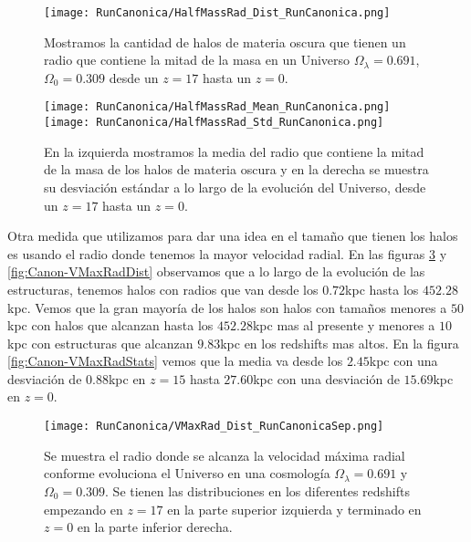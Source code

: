\begin{figure}[H]
    \centering
    \texttt{[image: RunCanonica/HalfMassRad\_Dist\_RunCanonica.png]}
    \caption[Distribución del radio que contiene la mitad de la masa en un Universo $\Omega_\lambda = 0.691 $, $\Omega_0 = 0.309$]{\footnotesize Mostramos la cantidad de halos de materia oscura que tienen un radio que contiene la mitad de la masa en un Universo $\Omega_\lambda = 0.691 $, $\Omega_0 = 0.309$ desde un $z=17$ hasta un $z=0$.}
    \label{fig:Canon-HalfMassRadDist}
\end{figure}

\begin{figure}[H]
    \centering
    \texttt{[image: RunCanonica/HalfMassRad\_Mean\_RunCanonica.png]}
    \texttt{[image: RunCanonica/HalfMassRad\_Std\_RunCanonica.png]}
    \caption[Media y desviación estándar del radio de la mitad de la masa de un Universo $\Omega_\lambda = 0.691 $, $\Omega_0 = 0.309$]{\footnotesize En la izquierda mostramos la media del radio que contiene la mitad de la masa de los halos de materia oscura y en la derecha se muestra su desviación estándar a lo largo de la evolución del Universo, desde un $z=17$ hasta un $z=0$.}
    \label{fig:Canon-HalfMassRadStats}
\end{figure}

Otra medida que utilizamos para dar una idea en el tamaño que tienen los halos es usando el radio donde tenemos la mayor velocidad radial. En las figuras \ref{fig:Canon-VMaxRadDistSep} y \ref{fig:Canon-VMaxRadDist} observamos que a lo largo de la evolución de las estructuras, tenemos halos con radios que van desde los $0.72$kpc hasta los $452.28$kpc. Vemos que la gran mayoría de los halos son halos con tamaños menores a $50$kpc con halos que alcanzan hasta los $452.28$kpc mas al presente y menores a $10$kpc con estructuras que alcanzan $9.83$kpc en los redshifts mas altos. En la figura \ref{fig:Canon-VMaxRadStats} vemos que la media va desde los $2.45$kpc con una desviación de $0.88$kpc en $z=15$ hasta $27.60$kpc con una desviación de $15.69$kpc en $z=0$.

\begin{figure}[H]
    \centering
    \texttt{[image: RunCanonica/VMaxRad\_Dist\_RunCanonicaSep.png]}
    \caption[Radio donde se alcanza la velocidad máxima radial en la evolución de un Universo $\Omega_\lambda = 0.691 $, $\Omega_0 = 0.309$]{\footnotesize Se muestra el radio donde se alcanza la velocidad máxima radial conforme evoluciona el Universo en una cosmología $\Omega_\lambda = 0.691 $ y $\Omega_0 = 0.309$. Se tienen las distribuciones en los diferentes redshifts empezando en $z=17$ en la parte superior izquierda y terminado en $z=0$ en la parte inferior derecha.}
    \label{fig:Canon-VMaxRadDistSep}
\end{figure}

